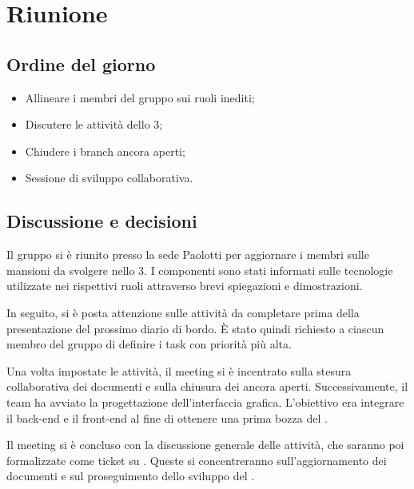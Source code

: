 \section{Riunione}
\subsection{Ordine del giorno}
\begin{itemize}
	\item Allineare i membri del gruppo sui ruoli inediti;
	\item Discutere le attività dello  3;
	\item Chiudere i branch ancora aperti;
	\item Sessione di sviluppo collaborativa.
\end{itemize}

\subsection{Discussione e decisioni}
\par Il gruppo si è riunito presso la sede Paolotti per aggiornare i membri sulle mansioni da svolgere nello  3. I componenti sono stati informati sulle tecnologie utilizzate nei rispettivi ruoli attraverso brevi spiegazioni e dimostrazioni.

\par In seguito, si è posta attenzione sulle attività da completare prima della presentazione del prossimo diario di bordo. È stato quindi richiesto a ciascun membro del gruppo di definire i task con priorità più alta.

\par Una volta impostate le attività, il meeting si è incentrato sulla stesura collaborativa dei documenti e sulla chiusura dei  ancora aperti. Successivamente, il team ha avviato la progettazione dell'interfaccia grafica. L’obiettivo era integrare il back-end e il front-end al fine di ottenere una prima bozza del .

\par Il meeting si è concluso con la discussione generale delle attività, che saranno poi formalizzate come ticket su . Queste si concentreranno sull'aggiornamento dei documenti e sul proseguimento dello sviluppo del .